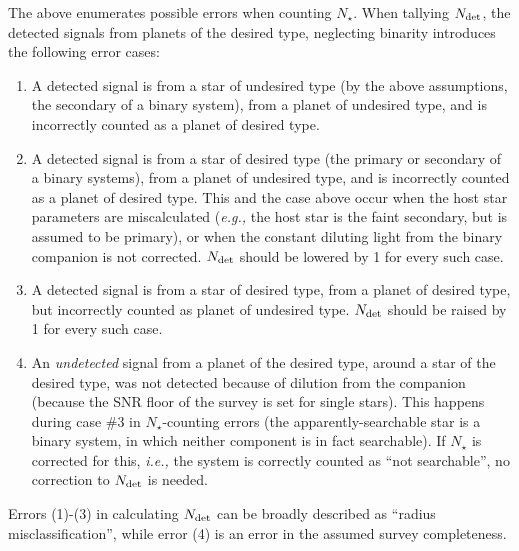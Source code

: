 \documentclass{emulateapj}
\begin{document}
The above enumerates possible errors when counting $N_\star$.
When tallying $N_{\rm det}$, the detected signals from planets of the desired 
type, neglecting binarity introduces the following error cases:
\begin{enumerate}
\item 
A detected signal is from a star of undesired type (by the above assumptions, 
the secondary of a binary system), from a planet of undesired type, and is 
incorrectly counted as a planet of desired type.
%
\item
A detected signal is from a star of desired type (the primary or secondary of 
a binary systems), from a planet of undesired type, and is incorrectly counted 
as a planet of desired type.
This and the case above occur when the host star parameters are miscalculated 
({\it e.g.,} the host star is the faint secondary, but is assumed to be 
primary), or when the constant diluting light from the binary companion is not 
corrected.
$N_{\rm det}$ should be lowered by 1 for every such case.
%
\item
A detected signal is from a star of desired type, from a planet of desired 
type, but incorrectly counted as planet of undesired type.
$N_{\rm det}$ should be raised by 1 for every such case.
\item
An {\it undetected} signal from a planet of the desired type, around a star of 
the desired type, was not detected because of dilution from the companion 
(because the SNR floor of the survey is set for single stars). 
This happens during case \#3 in $N_\star$-counting errors (the 
apparently-searchable star is a binary system, in which neither component is 
in fact searchable). If $N_\star$ is corrected for this, {\it i.e.,} the 
system is correctly counted as ``not searchable'', no correction to $N_{\rm 
det}$ is needed.
\end{enumerate}

Errors (1)-(3) in calculating $N_{\rm det}$ can be broadly described as 
``radius misclassification'', while error (4) is an error in the assumed 
survey completeness.
\end{document}
